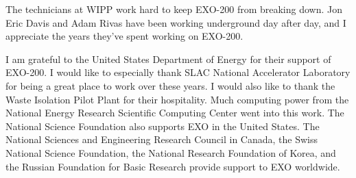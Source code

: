 The technicians at WIPP work hard to keep EXO-200 from breaking down. Jon Eric Davis and Adam Rivas have been working underground day after day, and I appreciate the years they've spent working on EXO-200.

I am grateful to the United States Department of Energy for their support of EXO-200. I would like to especially thank SLAC National Accelerator Laboratory for being a great place to work over these years. I would also like to thank the Waste Isolation Pilot Plant for their hospitality. Much computing power from the National Energy Research Scientific Computing Center went into this work. The National Science Foundation also supports EXO in the United States. The National Sciences and Engineering Research Council in Canada, the Swiss National Science Foundation, the National Research Foundation of Korea, and the Russian Foundation for Basic Research provide support to EXO worldwide.
